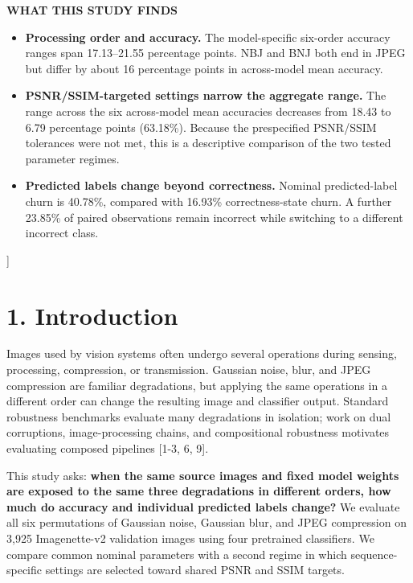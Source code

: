 \documentclass[10pt,twocolumn]{article}
\providecommand{\tightlist}{%
  \setlength{\itemsep}{0pt}\setlength{\parskip}{0pt}}
\begin{document}
\begin{@twocolumnfalse}
\begin{tcolorbox}
{\large\bfseries WHAT THIS STUDY FINDS\par}\vspace{0.25em}
\small
\begin{itemize}
\tightlist
\item
  \textbf{Processing order and accuracy.} The model-specific six-order
  accuracy ranges span 17.13--21.55 percentage points. NBJ and BNJ both
  end in JPEG but differ by about 16 percentage points in across-model
  mean accuracy.
\item
  \textbf{PSNR/SSIM-targeted settings narrow the aggregate range.} The
  range across the six across-model mean accuracies decreases from 18.43
  to 6.79 percentage points (63.18\%). Because the prespecified
  PSNR/SSIM tolerances were not met, this is a descriptive comparison of
  the two tested parameter regimes.
\item
  \textbf{Predicted labels change beyond correctness.} Nominal
  predicted-label churn is 40.78\%, compared with 16.93\%
  correctness-state churn. A further 23.85\% of paired observations
  remain incorrect while switching to a different incorrect class.
\end{itemize}
\end{tcolorbox}
\end{@twocolumnfalse}
]

\section{1. Introduction}\label{introduction}

Images used by vision systems often undergo several operations during
sensing, processing, compression, or transmission. Gaussian noise, blur,
and JPEG compression are familiar degradations, but applying the same
operations in a different order can change the resulting image and
classifier output. Standard robustness benchmarks evaluate many
degradations in isolation; work on dual corruptions, image-processing
chains, and compositional robustness motivates evaluating composed
pipelines {[}1-3, 6, 9{]}.

This study asks: \textbf{when the same source images and fixed model
weights are exposed to the same three degradations in different orders,
how much do accuracy and individual predicted labels change?} We
evaluate all six permutations of Gaussian noise, Gaussian blur, and JPEG
compression on 3,925 Imagenette-v2 validation images using four
pretrained classifiers. We compare common nominal parameters with a
second regime in which sequence-specific settings are selected toward
shared PSNR and SSIM targets.
\end{document}
